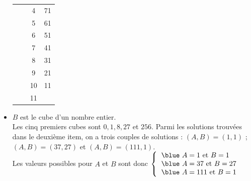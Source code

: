 \begin{corrige}
\begin{itemize}
\begin{tabular}{|C{0.8}|c|C{0.8}|C{0.8}|}
            & & 4 & 71 \\
            & & 5 & 61 \\
            & & 6 & 51 \\
            & & 7 & 41 \\
            & & 8 & 31 \\
            & & 9 & 21 \\
            & & 10 & 11 \\
            & & 11 & {} \\
            \hline
         \end{tabular}
         \bigskip
      \item $B$ est le cube d'un nombre entier. \\
         Les cinq premiers cubes sont $0, 1, 8, 27$ et $256$. Parmi les solutions trouvées dans le deuxième item, on a trois couples de solutions : $(A,B) =(1,1)$ \quad ; \quad $(A,B) =(37,27)$ \quad et \quad $(A,B) =(111,1)$. \\ 
         Les valeurs possibles pour  $A$ et $B$ sont donc $\left\{\begin{tabular}{l}
           {\blue  $A=1$ et $B=1$} \\ {\blue $A =37$ et $B=27$} \\ {\blue $A =111$ et $B =1$}  \\
         \end{tabular}\right.$
   \end{itemize}
\end{corrige}


\bigskip


